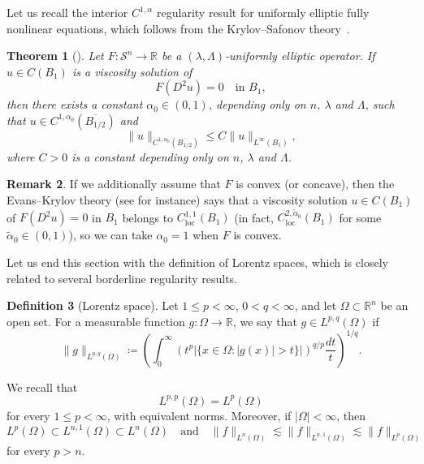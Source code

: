 \documentclass[11pt]{amsart}
\theoremstyle{plain}
\newtheorem{theorem}{Theorem}[section]
\theoremstyle{definition}
\newtheorem{definition}[theorem]{Definition}
\newtheorem{remark}[theorem]{Remark}
\numberwithin{equation}{section}
\begin{document}
Let us recall the interior $C^{1, \alpha}$ regularity result for uniformly elliptic fully nonlinear equations, which follows from the Krylov--Safonov theory~\cite{KS79, KS80}.
\begin{theorem}[{\cite[Corollary~5.7]{CC95}}]\label{thm-KS}
    Let $F:\mathcal{S}^n \to \mathbb{R}$ be a $(\lambda, \Lambda)$-uniformly elliptic operator. If $u \in C(B_1)$ is a viscosity solution of 
    \begin{equation*}
        F(D^2u)=0 \quad \text{in $B_1$},
    \end{equation*}
    then there exists a constant $\alpha_0 \in (0,1)$, depending only on $n$, $\lambda$ and $\Lambda$, such that $u \in C^{1, \alpha_0}(\overline{B_{1/2}})$ and
    \begin{equation*}
        \|u\|_{C^{1, \alpha_0}(\overline{B_{1/2}})} \leq C\|u\|_{L^{\infty}(B_1)},
    \end{equation*}
    where $C>0$ is a constant depending only on $n$, $\lambda$ and $\Lambda$.
\end{theorem}

\begin{remark}
    If we additionally assume that $F$ is convex (or concave), then the Evans--Krylov theory (see \cite[Section~6]{CC95} for instance) says that a viscosity solution $u \in C(B_1)$ of $F(D^2u)=0$ in $B_1$ belongs to  $C^{1,1}_{\mathrm{loc}}(B_1)$ (in fact, $ C_{\mathrm{loc}}^{2, \tilde \alpha_0}(B_1)$ for some $\tilde \alpha_0 \in (0,1)$), so we can take $\alpha_0=1$ when $F$ is convex.
\end{remark}

Let us end this section with the definition of Lorentz spaces, which is closely related to several borderline regularity results.
\begin{definition}[Lorentz space]\label{def-Lorentz}
Let $1\leq p<\infty$, $0<q<\infty$, and let $\Omega\subset\mathbb{R}^n$ be an open set. For a measurable function $g:\Omega\to\mathbb{R}$, we say that $g\in L^{p,q}(\Omega)$ if
\begin{equation*}
    \|g\|_{L^{p,q}(\Omega)}
    \coloneqq \left(\int_0^\infty\left(t^p\left|\{x\in\Omega: |g(x)|>t\}\right|\right)^{q/p}\frac{dt}{t}\right)^{1/q}.
\end{equation*}
\end{definition}

We recall that
\begin{equation*}
    L^{p,p}(\Omega)=L^p(\Omega)
\end{equation*}
for every $1\leq p<\infty$, with equivalent norms. Moreover, if $|\Omega|<\infty$, then
\begin{equation*}
    L^p(\Omega)\subset L^{n,1}(\Omega)\subset L^n(\Omega) \quad \text{and} \quad \|f\|_{L^n(\Omega)} \lesssim \|f\|_{L^{n, 1}(\Omega)} \lesssim\|f\|_{L^p(\Omega)}
\end{equation*}
for every $p>n$. 
\end{document}
